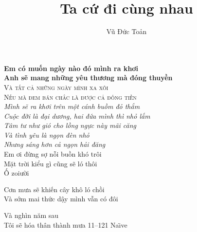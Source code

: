 \documentclass[12pt,a4paper]{report}
\title{Ta cứ đi cùng nhau}
\author{Vũ Đức Toản}
\begin{document}
 
\maketitle
	\textbf{Em có muốn ngày nào đó mình ra khơi \\
		Anh sẽ mang những yêu thương mà đóng thuyền\\}
	\textsc{Và tất cả những ngày mình xa xôi \\
		Nếu mà đem bán chắc là được cả đống tiền\\ }
	\emph{Mình sẽ ra khơi trên một cánh buồm đỏ thắm \\
		Cuộc đời là đại dương, hai đứa mình thì nhỏ lắm\\ }
	\textit{Tâm tư như gió cho lồng ngực này mãi căng \\
		Và tình yêu là ngọn đèn nhỏ\\}
	\textsl{Nhưng sáng hơn cả ngọn hải đăng }
	\ttfamily
\\	Em ơi đừng sợ nỗi buồn khó trôi \\
	
	Mặt trời kiểu gì cũng sẽ ló thôi\\
	Ố zoiười
\normalfont
	\begin{upshape}
		
	Cơn mưa sẽ khiến cây khô ló chồi \\
		Và sớm mai thức dậy mình vẫn có đôi\\
	\end{upshape}
\small Và nghìn năm sau\\
\huge Tôi sẽ hóa thân thành mưa 11--121 Na\"{\i}ve \\
\end{document}

